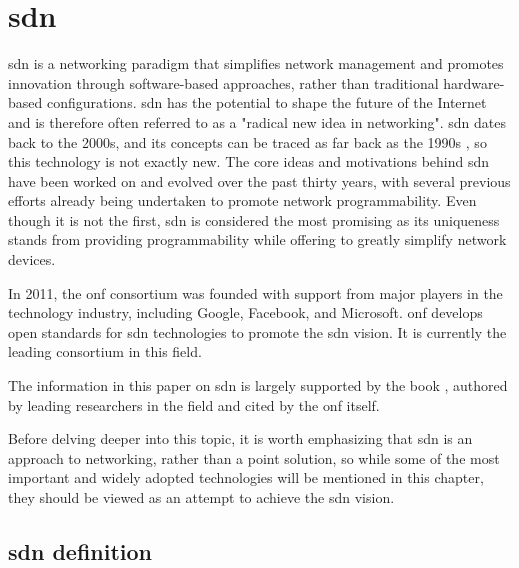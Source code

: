 
%

\chapter[Software Defined Networking]{\acrlong{sdn}} %
\label{cha:sdn}


\gls{sdn} is a networking paradigm that simplifies network management and promotes innovation through software-based approaches, rather than traditional hardware-based configurations. \gls{sdn} has the potential to shape the future of the Internet and is therefore often referred to as a "radical new idea in networking". \cite{nunes_survey_2014}
\gls{sdn} dates back to the 2000s, and its concepts can be traced as far back as the 1990s \cite{feamster_road_2013}, so this technology is not exactly new. The core ideas and motivations behind \gls{sdn} have been worked on and evolved over the past thirty years, with several previous efforts already being undertaken to promote network programmability\cite{feamster_road_2013}. Even though it is not the first, \gls{sdn} is considered the most promising as its uniqueness stands from providing programmability while offering to greatly simplify network devices. \cite{xia_survey_2015} 

In 2011, the \gls{onf} consortium was founded with support from major players in the technology industry, including Google, Facebook, and Microsoft. \gls{onf} develops open standards for \gls{sdn} technologies to promote the \gls{sdn} vision. It is currently the leading consortium in this field. \cite{noauthor_open_nodate} 

The information in this paper on \gls{sdn} is largely supported by the book \cite{peterson_software-defined_2021}, authored by leading researchers in the field and cited by the \gls{onf} itself.

Before delving deeper into this topic, it is worth emphasizing that \gls{sdn} is an approach to networking, rather than a point solution, so while some of the most important and widely adopted technologies will be mentioned in this chapter, they should be viewed as an attempt to achieve the \gls{sdn} vision.


\section[SDN definition]{\gls{sdn} definition}

